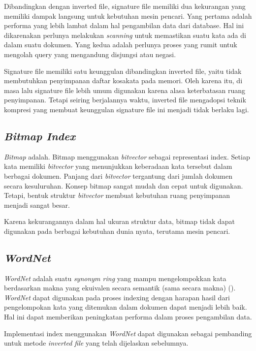 Dibandingkan dengan inverted file, signature file memiliki dua kekurangan yang
memiliki dampak langsung untuk kebutuhan mesin pencari. Yang pertama adalah
performa yang lebih lambat dalam hal pengambilan data dari database. Hal ini
dikarenakan perlunya melakukan \emph{scanning} untuk memastikan suatu kata ada
di dalam suatu dokumen. Yang kedua adalah perlunya proses yang rumit untuk
mengolah query yang mengandung disjungsi atau negasi.

Signature file memiliki satu keunggulan dibandingkan inverted file, yaitu tidak
membutuhkan penyimpanan daftar kosakata pada memori. Oleh karena itu, di masa
lalu signature file lebih umum digunakan karena alasa keterbatasan ruang
penyimpanan. Tetapi seiring berjalannya waktu, inverted file mengadopsi teknik
kompresi yang membuat keunggulan signature file ini menjadi tidak berlaku lagi.

\subsection{\emph{Bitmap Index}}

\emph{Bitmap} adalah. Bitmap menggunakan \emph{bitvector} sebagai representasi
index. Setiap kata memiliki \emph{bitvector} yang menunjukkan keberadaan kata
tersebut dalam berbagai dokumen. Panjang dari \emph{bitvector} tergantung dari
jumlah dokumen secara kesuluruhan. Konsep bitmap sangat mudah dan cepat untuk
digunakan. Tetapi, bentuk struktur \emph{bitvector} membuat kebutuhan ruang
penyimpanan menjadi sangat besar.

Karena kekurangannya dalam hal ukuran struktur data, bitmap tidak dapat
digunakan pada berbagai kebutuhan dunia nyata, terutama mesin pencari.

\subsection{\emph{WordNet}}

\emph{WordNet} adalah suatu \emph{synonym ring} yang mampu mengelompokkan kata
berdasarkan makna yang ekuivalen secara semantik (sama secara makna) (\cite{gonzalo1998wordnet}).
\emph{WordNet} dapat digunakan pada proses indexing dengan harapan hasil dari
pengelompokan kata yang ditemukan dalam dokumen dapat menjadi lebih baik. Hal
ini dapat memberikan peningkatan performa dalam proses pengambilan data.

Implementasi index menggunakan \emph{WordNet} dapat digunakan sebagai pembanding
untuk metode \emph{inverted file} yang telah dijelaskan sebelumnya.
